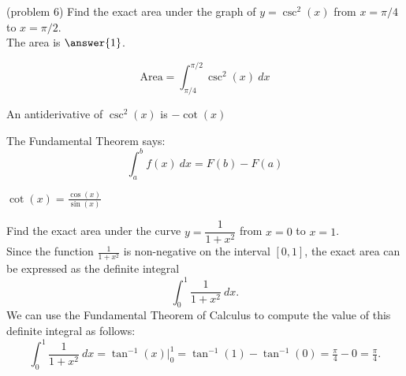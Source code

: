 \documentclass[handout]{ximera}
\begin{document}
\begin{problem}(problem 6)
Find the exact area under the graph of $y = \csc^2(x)$ from $x = \pi/4$ to $x = \pi/2$.\\
The area is $\answer{1}$.
 \begin{hint}
  \[
  \text{Area} = \int_{\pi/4}^{\pi/2} \csc^2(x) \ dx
  \]
\end{hint}  
    \begin{hint}
      An antiderivative of $\csc^2(x)$ is $-\cot(x)$
    \end{hint}
    
    \begin{hint}
      The Fundamental Theorem says:
      \[
      \int_a^b f(x) \ dx = F(b) - F(a)
      \]
    \end{hint}    
		\begin{hint}
      $\cot(x) = \frac{\cos(x)}{\sin(x)}$
    \end{hint}
		
\end{problem}


\begin{example}[example 7]
Find the exact area under the curve $y = \dfrac{1}{1+x^2}$ from $x=0$ to $x= 1$.\\
Since the function $\frac{1}{1+x^2}$ is non-negative on the interval $[0, 1]$, the exact area can be expressed as the definite 
integral
\[\int_0^{1} \frac{1}{1+x^2} \ dx.\]
We can use the Fundamental Theorem of Calculus to compute the value of this definite integral as follows:
\[
\int_0^{1} \frac{1}{1+x^2} \ dx = \tan^{-1}(x) \Big|_0^1 
= \tan^{-1}(1)- \tan^{-1}(0) = \tfrac{\pi}{4}-0 =\tfrac{\pi}{4}.
\]


\begin{image}
\end{image}


\end{example}
\end{document}
